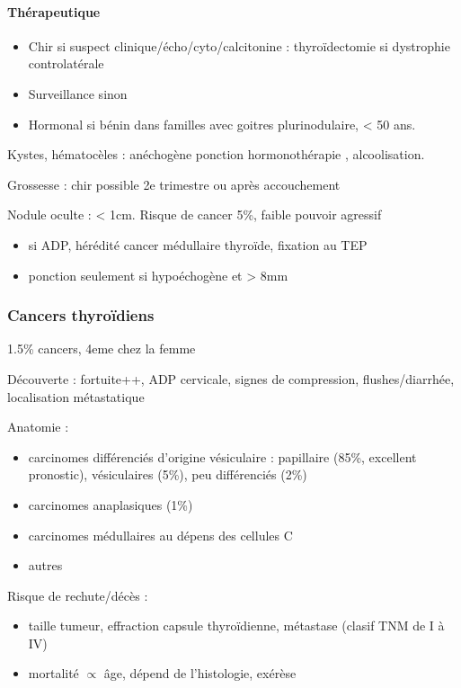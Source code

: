 \documentclass[11pt]{article}
\begin{document}
\paragraph{Thérapeutique}
\label{sec:org9ead6fa}
\begin{itemize}
\item Chir si suspect clinique/écho/cyto/calcitonine \inc\inc{} : thyroïdectomie si dystrophie controlatérale
\item Surveillance sinon
\item Hormonal si bénin dans familles avec goitres plurinodulaire, < 50 ans.
\end{itemize}

Kystes, hématocèles : anéchogène \thus ponction \textpm{} hormonothérapie , alcoolisation.

Grossesse : chir possible 2e trimestre ou après accouchement 

Nodule oculte : < 1cm. Risque de cancer 5\%, faible pouvoir agressif
\begin{itemize}
\item \danger si ADP, hérédité cancer médullaire thyroïde, fixation au TEP
\item ponction seulement si hypoéchogène et > 8mm
\end{itemize}
\subsubsection{Cancers thyroïdiens}
\label{sec:orgfa7c68c}
1.5\% cancers, 4eme chez la femme

Découverte : fortuite++, ADP cervicale, signes de compression, flushes/diarrhée,
localisation métastatique

Anatomie :
\begin{itemize}
\item carcinomes différenciés d'origine vésiculaire : papillaire (85\%, excellent
pronostic), vésiculaires (5\%), peu différenciés (2\%)
\item carcinomes anaplasiques (1\%)
\item carcinomes médullaires au dépens des cellules C
\item autres
\end{itemize}

Risque de rechute/décès : 
\begin{itemize}
\item taille tumeur, effraction capsule thyroïdienne, métastase (clasif TNM de I à IV)
\item mortalité \(\propto\) âge, dépend de l'histologie, exérèse
\end{itemize}
\end{document}
